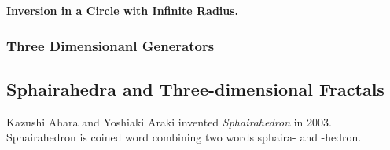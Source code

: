 \noindent\textbf{Inversion in a Circle with Infinite Radius.}

\subsubsection{Three Dimensionanl Generators}



\subsection{Sphairahedra and Three-dimensional Fractals}


Kazushi Ahara and Yoshiaki Araki invented \textit{Sphairahedron} in
2003.
Sphairahedron is coined word combining two words sphaira- and -hedron.